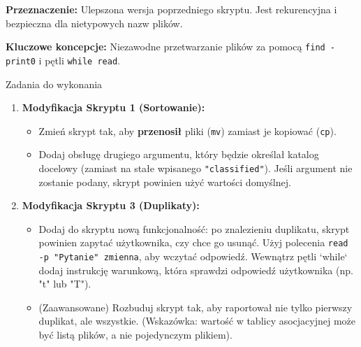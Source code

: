 \begin{tcolorbox}[colback=black!5, colframe=titlebg, title=Skrypt 3: Wyszukiwanie Duplikatów (Wersja Zaawansowana), breakable]
\textbf{Przeznaczenie:} Ulepszona wersja poprzedniego skryptu. Jest rekurencyjna i bezpieczna dla nietypowych nazw plików.
\textbf{Kluczowe koncepcje:} Niezawodne przetwarzanie plików za pomocą \texttt{find -print0} i pętli \texttt{while read}.
\end{tcolorbox}


\begin{importantbox}{Zadania do wykonania}
\begin{enumerate}
    \item \textbf{Modyfikacja Skryptu 1 (Sortowanie):}
    \begin{itemize}
        \item Zmień skrypt tak, aby \textbf{przenosił} pliki (\texttt{mv}) zamiast je kopiować (\texttt{cp}).
        \item Dodaj obsługę drugiego argumentu, który będzie określał katalog docelowy (zamiast na stałe wpisanego \texttt{"classified"}). Jeśli argument nie zostanie podany, skrypt powinien użyć wartości domyślnej.
    \end{itemize}
    \item \textbf{Modyfikacja Skryptu 3 (Duplikaty):}
    \begin{itemize}
        \item Dodaj do skryptu nową funkcjonalność: po znalezieniu duplikatu, skrypt powinien zapytać użytkownika, czy chce go usunąć. Użyj polecenia \texttt{read -p "Pytanie" zmienna}, aby wczytać odpowiedź. Wewnątrz pętli `while` dodaj instrukcję warunkową, która sprawdzi odpowiedź użytkownika (np. "t" lub "T").
        \item (Zaawansowane) Rozbuduj skrypt tak, aby raportował nie tylko pierwszy duplikat, ale wszystkie. (Wskazówka: wartość w tablicy asocjacyjnej może być listą plików, a nie pojedynczym plikiem).
    \end{itemize}
\end{enumerate}
\end{importantbox}
